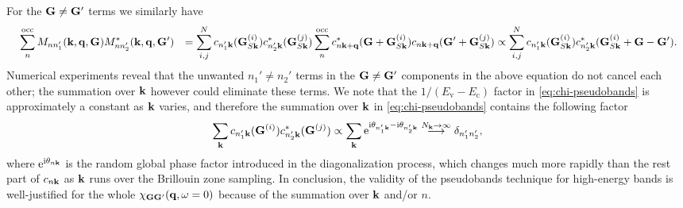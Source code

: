 \documentclass[hyperref, a4paper]{article}
\newcommand*{\ii}{\mathrm{i}}
\newcommand*{\ee}{\mathrm{e}}
\def\\{}%
\begin{document}
For the $\vb{G} \neq \vb{G}'$ terms we similarly have 
\begin{equation}
    \begin{aligned}
        &\quad \sum_n^{\text{occ}} M_{n n'_1} (\vb{k}, \vb{q}, \vb{G}) M^*_{n n'_2} (\vb{k}, \vb{q}, \vb{G}') \\
        &= \sum_{i , j}^N 
        c_{n'_1 \vb{k}}(\vb{G}_{S \vb{k}}^{(i)}) 
        c^{*}_{n'_2 \vb{k}}(\vb{G}_{S \vb{k}}^{(j)})
        \sum_{n}^{\text{occ}} 
        c_{n \vb{k} + \vb{q}}^*(\vb{G}  + \vb{G}^{(i)}_{S \vb{k}})
        c_{n \vb{k} + \vb{q}}  (\vb{G}' + \vb{G}^{(j)}_{S \vb{k}}) \\
        &\propto \sum_{i , j}^N  
        c_{n'_1 \vb{k}}(\vb{G}^{(i)}_{S \vb{k}}) 
        c^{*}_{n'_2 \vb{k}}(\vb{G}^{(i)}_{S \vb{k}} + \vb{G} - \vb{G}') .
    \end{aligned}
\end{equation}
Numerical experiments reveal that the unwanted $n_1' \neq n_2'$ terms in the  
$\vb{G} \neq \vb{G}'$ components in the above equation 
do not cancel each other; 
the summation over $\vb{k}$ however could eliminate these terms.
We note that the $1 / (E_{\text{v}} - E_{\text{c}})$ factor in \eqref{eq:chi-pseudobands} 
is approximately a constant as $\vb{k}$ varies, 
and therefore the summation over $\vb{k}$ in \eqref{eq:chi-pseudobands} 
contains the following factor
\begin{equation}
    \sum_{\vb{k}} c_{n_1' \vb{k}}(\vb{G}^{(i)}) c^*_{n_2' \vb{k}}(\vb{G}^{(j)})
    \propto \sum_{\vb{k}} \ee^{\ii \theta_{n_1' \vb{k}} - \ii \theta_{n_2' \vb{k}}}
    \stackrel{N_{\vb{k}} \to \infty}{\longrightarrow} \delta_{n_1' n_2'},
    \label{eq:convergence}
\end{equation}
where $\ee^{\ii \theta_{n \vb{k}}}$ is the random global phase factor 
introduced in the diagonalization process,
which changes much more rapidly than the rest part of $c_{n \vb{k}}$
as $\vb{k}$ runs over the Brillouin zone sampling.
In conclusion, the validity of the pseudobands technique for high-energy bands
is well-justified for the whole $\chi_{\vb{G} \vb{G}'}(\vb{q}, \omega = 0)$
because of the summation over $\vb{k}$ and/or $n$.
\end{document}
